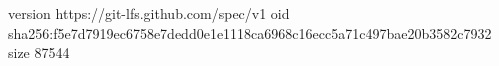 version https://git-lfs.github.com/spec/v1
oid sha256:f5e7d7919ec6758e7dedd0e1e1118ca6968c16ecc5a71c497bae20b3582c7932
size 87544
